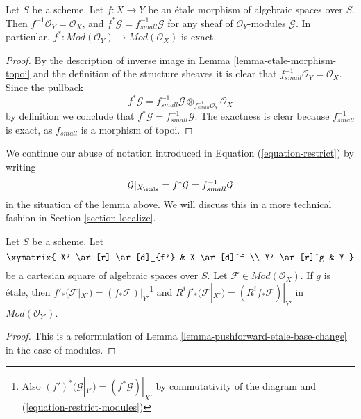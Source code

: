 \begin{lemma}
\label{lemma-etale-exact-pullback}
Let $S$ be a scheme.
Let $f : X \to Y$ be an \'etale morphism of algebraic spaces over $S$.
Then $f^{-1}\mathcal{O}_Y = \mathcal{O}_X$, and
$f^*\mathcal{G} = f_{small}^{-1}\mathcal{G}$ for any sheaf of
$\mathcal{O}_Y$-modules $\mathcal{G}$. In particular,
$f^* : \textit{Mod}(\mathcal{O}_Y) \to \textit{Mod}(\mathcal{O}_X)$
is exact.
\end{lemma}

\begin{proof}
By the description of inverse image in Lemma \ref{lemma-etale-morphism-topoi}
and the definition of the structure sheaves it is clear that
$f_{small}^{-1}\mathcal{O}_Y = \mathcal{O}_X$. Since the pullback
$$
f^*\mathcal{G} =
f_{small}^{-1}\mathcal{G} \otimes_{f_{small}^{-1}\mathcal{O}_Y}
\mathcal{O}_X
$$
by definition we conclude that $f^*\mathcal{G} = f_{small}^{-1}\mathcal{G}$.
The exactness is clear because $f_{small}^{-1}$ is exact, as $f_{small}$
is a morphism of topoi.
\end{proof}

\noindent
We continue our abuse of notation introduced in
Equation (\ref{equation-restrict})
by writing
\begin{equation}
\label{equation-restrict-modules}
\mathcal{G}|_{X_\etale}
= f^*\mathcal{G}
= f_{small}^{-1}\mathcal{G}
\end{equation}
in the situation of the lemma above. We will discuss this in a more
technical fashion in
Section \ref{section-localize}.

\begin{lemma}
\label{lemma-pushforward-etale-base-change-modules}
Let $S$ be a scheme. Let
$$
\xymatrix{
X' \ar[r] \ar[d]_{f'} & X \ar[d]^f \\
Y' \ar[r]^g & Y
}
$$
be a cartesian square of algebraic spaces over $S$. Let
$\mathcal{F} \in \textit{Mod}(\mathcal{O}_X)$. If $g$ is \'etale, then
$f'_*(\mathcal{F}|_{X'}) = (f_*\mathcal{F})|_{Y'}$\footnote{Also
$(f')^*(\mathcal{G}|_{Y'}) = (f^*\mathcal{G})|_{X'}$
by commutativity of the diagram and (\ref{equation-restrict-modules})} and
$R^if'_*(\mathcal{F}|_{X'}) = (R^if_*\mathcal{F})|_{Y'}$ in
$\textit{Mod}(\mathcal{O}_{Y'})$.
\end{lemma}

\begin{proof}
This is a reformulation of
Lemma \ref{lemma-pushforward-etale-base-change}
in the case of modules.
\end{proof}

